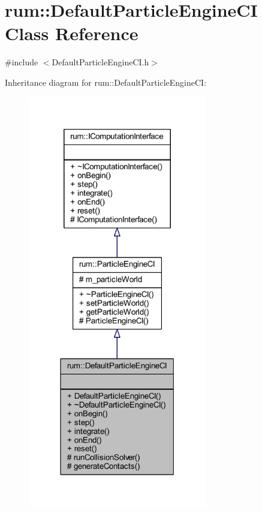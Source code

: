 \hypertarget{classrum_1_1_default_particle_engine_c_i}{}\section{rum\+:\+:Default\+Particle\+Engine\+CI Class Reference}
\label{classrum_1_1_default_particle_engine_c_i}


{\ttfamily \#include $<$Default\+Particle\+Engine\+C\+I.\+h$>$}



Inheritance diagram for rum\+:\+:Default\+Particle\+Engine\+CI\+:\nopagebreak
\begin{figure}[H]
\begin{center}
\leavevmode
\includegraphics[width=221pt]{classrum_1_1_default_particle_engine_c_i__inherit__graph}
\end{center}
\end{figure}



